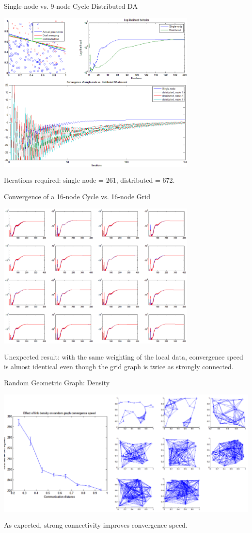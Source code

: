\documentclass{beamer}
\begin{document}
	\begin{frame}{Single-node vs. 9-node Cycle Distributed DA}
		\centerline{\includegraphics[width=0.75\textwidth]{singlenode-vs-dist.png}}
		Iterations required: single-node = 261, distributed = 672.
	\end{frame}
	
	\begin{frame}{Convergence of a 16-node Cycle vs. 16-node Grid}
		\centerline{\includegraphics[width=0.75\textwidth]{grid-vs-cycle-ll-per-node.png}}
		Unexpected result: with the same weighting of the local data, convergence
		speed is almost identical even though the grid graph is twice as strongly 
		connected.
	\end{frame}
	
	\begin{frame}{Random Geometric Graph: Density}
		\centerline{\includegraphics[width=\textwidth]{density_vs_conv.png}}
		As expected, strong connectivity improves convergence speed.
	\end{frame}	
\end{document}
